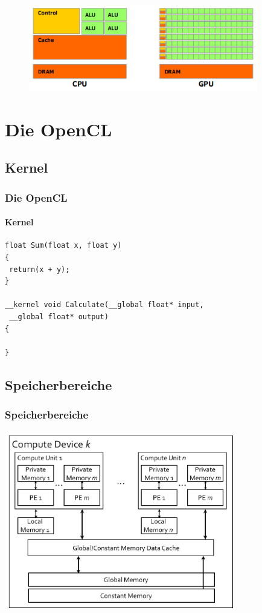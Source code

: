 \documentclass{beamer}
\begin{document}
\begin{frame}[fragile]
\begin{figure}
\begin{center}
\includegraphics[width=10cm]{cpu_gpu.png}
\end{center}
\end{figure}
\end{frame}

\section{Die OpenCL}
\subsection{Kernel}
\begin{frame}[fragile]
\frametitle{Die OpenCL}
\framesubtitle{Kernel}
\begin{lstlisting}
float Sum(float x, float y)
{
 return(x + y);
}

__kernel void Calculate(__global float* input,
 __global float* output)
{
 
}
\end{lstlisting}
\end{frame}

\subsection{Speicherbereiche}
\begin{frame}[fragile]
\frametitle{Speicherbereiche}
\begin{center}
\includegraphics[width=10cm]{opencl_memory.jpg}
\end{center}
\end{frame}
\end{document}
